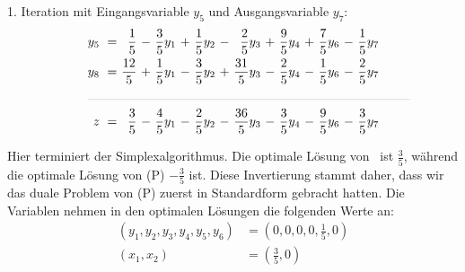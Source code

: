 \documentclass [a4paper,11pt]{article}
\begin{document}
\begin{enumerate}
            1. Iteration mit Eingangsvariable $y_5$ und Ausgangsvariable $y_7$:
            \begin{align*}
            \begin{alignedat}{12}
            && y_5 &\ = &\  \frac{1}{5} &\ - &\ \frac{3}{5}y_1 &\ + &\ \frac{1}{5}y_2 &\ - &\  \frac{2}{5}y_3 &\ + &\ \frac{9}{5}y_4 &\ + &\ \frac{7}{5}y_6 &\ - &\ \frac{1}{5}y_7 \\
            && y_8 &\ = &\ \frac{12}{5} &\ + &\ \frac{1}{5}y_1 &\ - &\ \frac{3}{5}y_2 &\ + &\ \frac{31}{5}y_3 &\ - &\ \frac{2}{5}y_4 &\ - &\ \frac{1}{5}y_6 &\ - &\ \frac{2}{5}y_7 \\
            &\rlap{\rule{9cm}{.1pt}} &&&&&&&&&&&&&&&\\
            && z   &\ = &\  \frac{3}{5} &\ - &\ \frac{4}{5}y_1 &\ - &\ \frac{2}{5}y_2 &\ - &\ \frac{36}{5}y_3 &\ - &\ \frac{3}{5}y_4 &\ - &\ \frac{9}{5}y_6 &\ - &\ \frac{3}{5}y_7 
            \end{alignedat}
            \end{align*}

            Hier terminiert der Simplexalgorithmus. Die optimale Lösung von \tilD \ ist $\frac{3}{5}$, während die optimale Lösung von (P) $-\frac{3}{5}$ ist.
            Diese Invertierung stammt daher, dass wir das duale Problem von (P) zuerst in Standardform gebracht hatten.
            Die Variablen nehmen in den optimalen Lösungen die folgenden Werte an:
            \begin{align*}
                (y_1,y_2,y_3,y_4,y_5,y_6) &= (0,0,0,0,\frac{1}{5},0)\\
                (x_1,x_2) &= (\frac{3}{5},0)
            \end{align*}


    \end{enumerate}
\end{document}
